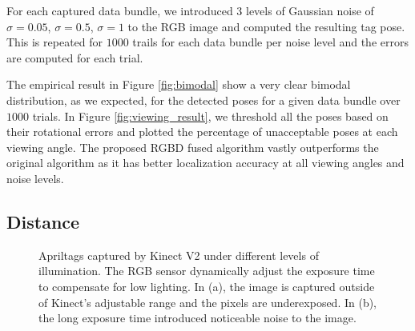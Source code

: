 For each captured data bundle, we introduced 3 levels of Gaussian noise of $\sigma = 0.05$, $\sigma = 0.5$, $\sigma = 1$  to the RGB image and computed the resulting tag pose. This is repeated for $1000$ trails for each data bundle per noise level and the errors are computed for each trial.  

The empirical result in Figure \ref{fig:bimodal} show a very clear bimodal distribution, as we expected, for the detected poses for a given data bundle over $1000$ trials. In Figure \ref{fig:viewing_result}, we threshold all the poses based on their rotational errors and plotted the percentage of unacceptable poses at each viewing angle. The proposed RGBD fused algorithm vastly outperforms the original algorithm as it has better localization accuracy at all viewing angles and noise levels. 

\subsection{Distance}

\begin{figure}
\centering
{}
\label{fig:illumination_tag}
\caption{Apriltags captured by Kinect V2 under different levels of illumination. The RGB sensor dynamically adjust the exposure time to compensate for low lighting. In (a), the image is captured outside of Kinect's adjustable range and the pixels are underexposed. In (b), the long exposure time introduced noticeable noise to the image. }
\end{figure}

